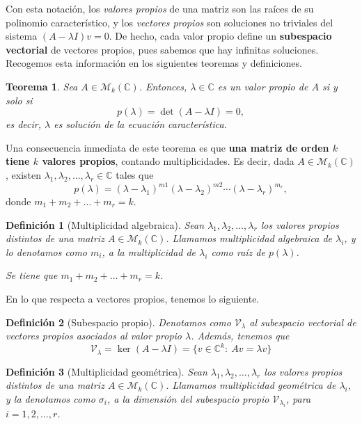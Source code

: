 \documentclass[11pt, a4paper]{article}
\newif\IfInSansMode
\numberwithin{equation}{section}
\newcommand{\la}{\lambda}
\newcommand{\pl}{p(\lambda)}
\theoremstyle{theorem-style}
\newtheorem{nth}{Teorema}[section]
\theoremstyle{definition-style}
\newtheorem{ndef}{Definición}[section]
\theoremstyle{remark-style}
\theoremstyle{example-style}
\begin{document}
Con esta notación, los \textit{valores propios} de una matriz son las raíces de su polinomio característico, y los \textit{vectores propios} son soluciones no triviales del sistema $(A - \lambda I)v = 0$. De hecho, cada valor propio define un \textbf{subespacio vectorial} de vectores propios, pues sabemos que hay infinitas soluciones. Recogemos esta información en los siguientes teoremas y definiciones.


\begin{nth} Sea $A \in \mathcal M_k(\mathbb C)$. Entonces, $\lambda \in \mathbb C$ es un valor propio de $A$ si y solo si $$p(\lambda) = \det(A - \lambda I)=0,$$ es decir, $\lambda$ es solución de la ecuación característica.
	
\end{nth}

Una consecuencia inmediata de este teorema es que \textbf{una matriz de orden $k$ tiene $k$ valores propios}, contando multiplicidades. Es decir, dada $A \in \mathcal M_k(\mathbb C)$, existen $\lambda_1,\lambda_2,\dots,\lambda_r \in \mathbb{C}$ tales que $$\pl = (\lambda - \lambda_1)^{m1}(\la - \la_2)^{m2} \cdots (\la - \la_r)^{m_r},$$ donde $m_1 + m_2 + \dots + m_r = k$.

\begin{ndef}[Multiplicidad algebraica] Sean $\lambda_1,\lambda_2,\dots,\lambda_r$ los valores propios distintos de una matriz $A \in \mathcal M_k(\mathbb C)$.
	Llamamos \textit{multiplicidad algebraica de} $\lambda_i$, y lo denotamos como $m_i$, a la multiplicidad de $\lambda_i$ como raíz de $p(\lambda)$.
	
	Se tiene que $m_1 + m_2 + \dots + m_r = k$.
	
\end{ndef}

En lo que respecta a vectores propios, tenemos lo siguiente.

\begin{ndef}[Subespacio propio] 
	Denotamos como $\mathcal V_\lambda$ al subespacio vectorial de vectores propios asociados al valor propio $\lambda$. Además, tenemos que $$\mathcal V_\lambda = \ker (A - \lambda I) = \{ v \in \mathbb C^k : \  Av = \lambda v\}$$
\end{ndef}

\begin{ndef}[Multiplicidad geométrica] Sean $\lambda_1,\lambda_2,\dots,\lambda_r$ los valores propios distintos de una matriz $A \in \mathcal M_k(\mathbb C)$.
	Llamamos \textit{multiplicidad geométrica de} $\lambda_i$, y la denotamos como $\sigma_i$, a la dimensión del subespacio propio $\mathcal V_{\lambda_i}$, para $i=1,2,\dots,r$.
\end{ndef}
\end{document}
